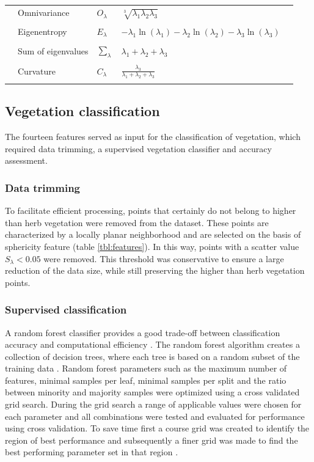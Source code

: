 \begin{table}[t]
\begin{tabular}{l l l l l}
		& Omnivariance & \(O_{\lambda}\) & \(\sqrt[3]{\lambda_{1} \lambda_{2} \lambda_{3}}\) & \citet{west2004context} \\ \\
		& Eigenentropy & \(E_{\lambda}\) & \(-\lambda_{1}\ln(\lambda_{1}) -\lambda_{2}\ln(\lambda_{2}) -\lambda_{3}\ln(\lambda_{3})\) & \citet{west2004context} \\ \\
		& Sum of eigenvalues & \(\sum_{\lambda}\) & \(\lambda_{1} + \lambda_{2} + \lambda_{3}\) & \cite{mallet2011relevance} \\ \\
		& Curvature & \(C_{\lambda}\) & \(\frac{\lambda_{3}}{\lambda_{1} + \lambda_{2} + \lambda_{3}}\) & \citet{pauly2002efficient} \\ \\
		\bottomrule
	\end{tabular}
\end{table}

\subsection{Vegetation classification}
The fourteen features served as input for the classification of vegetation, which required data trimming, a supervised vegetation classifier and accuracy assessment.

\subsubsection{Data trimming}
To facilitate efficient processing, points that certainly do not belong to higher than herb vegetation were removed from the dataset. These points are characterized by a locally planar neighborhood and are selected on the basis of sphericity feature (table \ref{tbl:features}). In this way, points with a scatter value \(S_{\lambda} < 0.05\) were removed. This threshold was conservative to ensure a large reduction of the data size, while still preserving the higher than herb vegetation points.

\subsubsection{Supervised classification}
A random forest classifier provides a good trade-off between classification accuracy and computational efficiency \citep{breiman2001random, weinmann2015semantic}. The random forest algorithm creates a collection of decision trees, where each tree is based on a random subset of the training data \citep{ho1998random}. Random forest parameters such as the maximum number of features, minimal samples per leaf, minimal samples per split and the ratio between minority and majority samples were optimized using a cross validated grid search. During the grid search a range of applicable values were chosen for each parameter and all combinations were tested and evaluated for performance using cross validation. To save time first a course grid was created to identify the region of best performance and subsequently a finer grid was made to find the best performing parameter set in that region \citep{hsu2003practical}.

